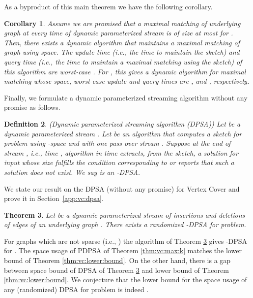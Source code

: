 \documentclass[11pt,letter]{article}
\newtheorem{theorem}{Theorem}
\newtheorem{corollary}[theorem]{Corollary}
\newtheorem{definition}[theorem]{Definition}
\begin{document}
As a byproduct of this main theorem we have the following corollary.

\begin{corollary}
\label{cor:general:MM:dyn:promised}
Assume we are promised that a maximal matching of underlying graph 
at every time  of dynamic parameterized stream  is of size
at most  for .
Then, there exists a dynamic algorithm that maintains
a maximal matching of graph  using  space.
The update time (i.e., the time to maintain the sketch)
and query time (i.e., the time to maintain a maximal matching using the sketch)
of this algorithm are worst-case . For ,
this gives a dynamic  algorithm for maximal matching whose space,
worst-case update and query times
are ,  and , respectively.
\end{corollary}




Finally, we formulate a dynamic parameterized streaming algorithm without any promise as follows.

\begin{definition}
({\sc Dynamic parameterized streaming algorithm (DPSA)})
\label{defn:dpsa}
Let  be a dynamic parameterized stream .
Let   be an algorithm  that computes a sketch for problem 
using -space and with one pass over stream .
Suppose at the end of stream , i.e., time , algorithm 
in time  extracts,  from the sketch,
a solution for input  whose  size fulfills
the condition corresponding to   or reports that such a solution does not exist.
We say  is an -DPSA.
\end{definition}

We state our result on the DPSA (without any promise) for Vertex Cover
and prove it in Section~\ref{app:vc:dpsa}.

\begin{theorem}
\label{THM:VC:DPSA}
Let  be a dynamic parameterized stream of  insertions and deletions of edges of an underlying graph .
There exists a randomized -DPSA for  problem.
\end{theorem}

For graphs which are not  sparse (i.e., ) the algorithm of Theorem \ref{THM:VC:DPSA}
gives -DPSA for .
The space usage of PDPSA of Theorem \ref{thm:vc:max:k} matches
the lower bound of Theorem \ref{thm:vc:lower:bound}. On the other hand,
there is a gap between space bound  of DPSA of Theorem \ref{THM:VC:DPSA}
and lower bound  of Theorem \ref{thm:vc:lower:bound}.
We conjecture that the lower bound for the space usage of any
(randomized) DPSA for  problem is indeed .
\end{document}

